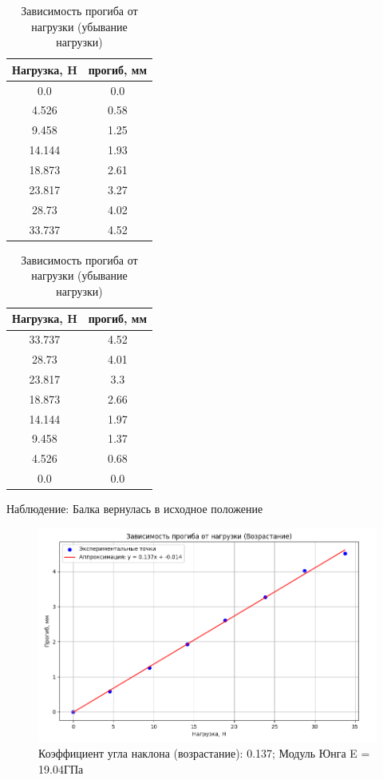 \documentclass[a4paper, 12pt]{article}
\begin{document}
\begin{table}[h]
\centering
\begin{minipage}{0.45\textwidth}
\centering
\caption{Зависимость прогиба от нагрузки (возрастание нагрузки)}
\begin{tabular}{|c|c|}
\hline
Нагрузка, H & прогиб, мм \\
\hline
0.0 & 0.0 \\
\hline
4.526 & 0.58 \\
\hline
9.458 & 1.25 \\
\hline
14.144 & 1.93 \\
\hline
18.873 & 2.61 \\
\hline
23.817 & 3.27 \\
\hline
28.73 & 4.02 \\
\hline
33.737 & 4.52 \\
\hline
\end{tabular}
\end{minipage}
\hfill
\begin{minipage}{0.45\textwidth}
\centering
\caption{Зависимость прогиба от нагрузки (убывание нагрузки)}
\begin{tabular}{|c|c|}
\hline
Нагрузка, H & прогиб, мм \\
\hline
33.737 & 4.52 \\
\hline
28.73 & 4.01 \\
\hline
23.817 & 3.3 \\
\hline
18.873 & 2.66 \\
\hline
14.144 & 1.97 \\
\hline
9.458 & 1.37 \\
\hline
4.526 & 0.68 \\
\hline
0.0 & 0.0 \\
\hline
\end{tabular}
\end{minipage}
\end{table}

Наблюдение: Балка вернулась в исходное положение


\begin{figure}[h]
\centering
\includegraphics[width=0.8\linewidth]{Graph 1.png}
\caption{Коэффициент угла наклона (возрастание): 0.137; Модуль Юнга E = 19.04ГПа}
\label{fig:increase}
\end{figure}
\end{document}
